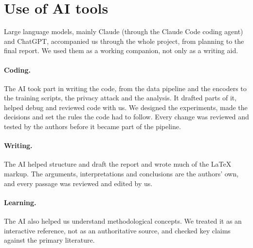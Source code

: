 \section*{Use of AI tools}
Large language models, mainly Claude (through the Claude Code coding agent) and ChatGPT, accompanied us through the
whole project, from planning to the final report. We used them as a working companion, not only as a writing aid.

\paragraph{Coding.} The AI took part in writing the code, from the data pipeline and the encoders to the training
scripts, the privacy attack and the analysis. It drafted parts of it, helped debug and reviewed code with us. We
designed the experiments, made the decisions and set the rules the code had to follow. Every change was reviewed and
tested by the authors before it became part of the pipeline.

\paragraph{Writing.} The AI helped structure and draft the report and wrote much of the \LaTeX{} markup. The
arguments, interpretations and conclusions are the authors' own, and every passage was reviewed and edited by us.

\paragraph{Learning.} The AI also helped us understand methodological concepts. We treated it as an interactive
reference, not as an authoritative source, and checked key claims against the primary literature.
